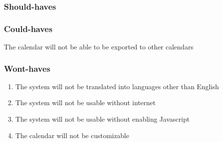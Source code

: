 \subsubsection{Should-haves}

\subsubsection{Could-haves}
  \item The calendar will not be able to be exported to other calendars

\subsubsection{Wont-haves}

\begin{enumerate}
  \item The system will not be translated into languages other than English

  \item The system will not be usable without internet

  \item The system will not be usable without enabling Javascript

  \item The calendar will not be customizable
\end{enumerate}




